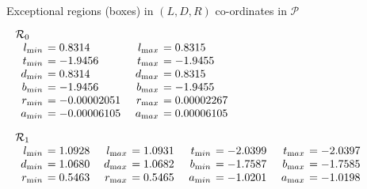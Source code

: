\begin{table}\label{GMT tab 1.2}
\caption{Exceptional regions (boxes) in $(L,D,R)$ co-ordinates in ${\mathcal P}$}
\begin{small}
$$
\begin{array}{rlrl}
\noalign{\noindent  ${\mathcal R}_0$}
\noalign{\vskip2pt}
l_{\textrm min} &\hskip-6pt =  0.8314&\enspace    l_{\textrm max}&\hskip-6pt  = 0.8315\\
t_{\textrm min} &\hskip-6pt =  -1.9456&\enspace    t_{\textrm max}&\hskip-6pt  = -1.9455\\
d_{\textrm min} &\hskip-6pt =  0.8314&  d_{\mathrm
max}&\hskip-6pt  = 0.8315\\   b_{\textrm min} &\hskip-6pt =  -1.9456&  b_{\textrm max} &\hskip-6pt = -1.9455\\
r_{\textrm min} &\hskip-6pt =  -0.00002051&  r_{\textrm max} &\hskip-6pt = 0.00002267\\  a_{\textrm min} &\hskip-6pt =  -0.00006105&  a_{\mathrm
max}&\hskip-6pt  = 0.00006105\end{array}
$$



$$\begin{array}{rlrlrlrl}
\noalign{\noindent  ${\mathcal R}_1$}
\noalign{\vskip2pt}
l_{\textrm min} &\hskip-6pt =  1.0928&\enspace    l_{\textrm max} &\hskip-6pt = 1.0931&\enspace   
t_{\textrm min} &\hskip-6pt =  -2.0399&\enspace   t_{\textrm max}&\hskip-6pt  = -2.0397\\
d_{\textrm min} &\hskip-6pt =  1.0680&  d_{\mathrm
max}&\hskip-6pt  = 1.0682&   b_{\textrm min} &\hskip-6pt =  -1.7587&  b_{\textrm max} &\hskip-6pt = -1.7585\\
r_{\textrm min} &\hskip-6pt =  0.5463& 
r_{\textrm max}&\hskip-6pt  = 0.5465&   a_{\textrm min} &\hskip-6pt =  -1.0201&  a_{\textrm max}&\hskip-6pt  = -1.0198\end{array}$$


\end{small}
\end{table}
